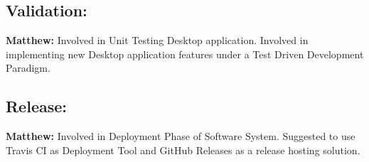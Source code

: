 \documentclass[12pt]{article}
\begin{document}
\subsection{Validation:}
\textbf{Matthew:} Involved in Unit Testing Desktop application. Involved in implementing new Desktop application features under a Test Driven Development Paradigm.

\subsection{Release:}
\textbf{Matthew:} Involved in Deployment Phase of Software System. Suggested to use Travis CI as Deployment Tool and GitHub Releases as a release hosting solution.
\end{document}
